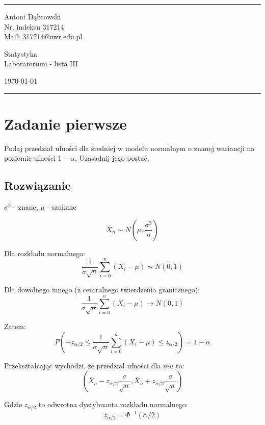 \documentclass[a4paper]{article}
\begin{document}

\fancyhead[C]{}
\hrule \medskip %
\begin{minipage}{0.295\textwidth} 
\raggedright
\footnotesize
Antoni Dąbrowski \hfill\\   
Nr. indeksu 317214\hfill\\
Mail: 317214@uwr.edu.pl
\end{minipage}
\begin{minipage}{0.4\textwidth} 
\centering 
\large 
Statystyka\\ 
\normalsize 
Laboratorium - lista III\\ 
\end{minipage}
\begin{minipage}{0.295\textwidth} 
\raggedleft
\today\hfill\\
\end{minipage}
\medskip\hrule 
\bigskip



\section{Zadanie pierwsze}
Podaj przedział ufności dla średniej w modelu normalnym o znanej wariancji na poziomie ufności $1-\alpha$. Uzasadnij jego postać.


\subsection{Rozwiązanie}
$\sigma^2$ - znane, $\mu$ - szukane

$$\bar{X}_n\sim N(\mu,\frac{\sigma^2}{n})$$

Dla rozkładu normalnego:
$$\frac{1}{\sigma\sqrt{n}}\sum_{i=0}^n(X_i-\mu)\sim N(0,1)$$

Dla dowolnego innego (z centralnego twierdzenia granicznego):
$$\frac{1}{\sigma\sqrt{n}}\sum_{i=0}^n(X_i-\mu)\rightarrow N(0,1)$$

Zatem:
$$P(-z_{\alpha/2}\leq\frac{1}{\sigma\sqrt{n}}\sum_{i=0}^n(X_i-\mu)\leq z_{\alpha/2})=1-\alpha$$

Przekształcając wychodzi, że przedział ufności dla $mu$ to:
$$(\bar{X}_n-z_{\alpha/2}\frac{\sigma}{\sqrt{n}},\bar{X}_n+z_{\alpha/2}\frac{\sigma}{\sqrt{n}})$$

Gdzie $z_{\alpha/2}$ to odwrotna dystybuanta rozkładu normalnego:
$$z_{\alpha/2}=\Phi^{-1}(\alpha/2)$$
\end{document}
